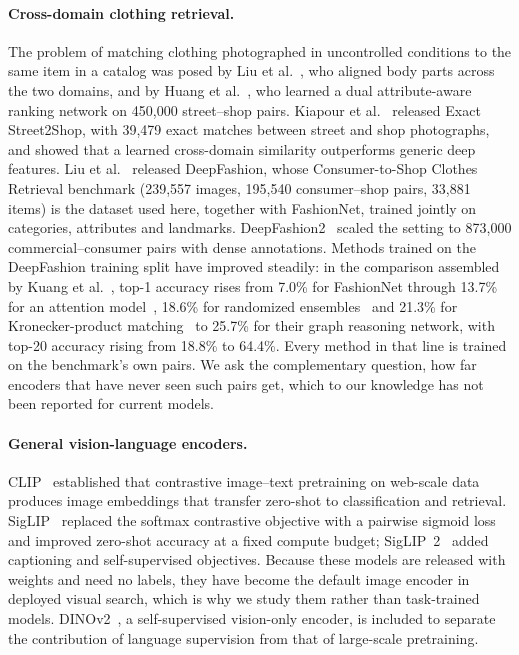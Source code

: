 \documentclass[10pt,twocolumn,letterpaper]{article}
\begin{document}
\paragraph{Cross-domain clothing retrieval.}
The problem of matching clothing photographed in uncontrolled conditions to the same item in a catalog was posed by Liu et al.~\cite{liu2012street}, who aligned body parts across the two domains, and by Huang et al.~\cite{huang2015darn}, who learned a dual attribute-aware ranking network on 450,000 street--shop pairs. Kiapour et al.~\cite{kiapour2015where} released Exact Street2Shop, with 39,479 exact matches between street and shop photographs, and showed that a learned cross-domain similarity outperforms generic deep features. Liu et al.~\cite{liu2016deepfashion} released DeepFashion, whose Consumer-to-Shop Clothes Retrieval benchmark (239,557 images, 195,540 consumer--shop pairs, 33,881 items) is the dataset used here, together with FashionNet, trained jointly on categories, attributes and landmarks. DeepFashion2~\cite{ge2019deepfashion2} scaled the setting to 873,000 commercial--consumer pairs with dense annotations. Methods trained on the DeepFashion training split have improved steadily: in the comparison assembled by Kuang et al.~\cite{kuang2019grnet}, top-1 accuracy rises from 7.0\% for FashionNet through 13.7\% for an attention model~\cite{wang2017vam}, 18.6\% for randomized ensembles~\cite{xuan2018dreml} and 21.3\% for Kronecker-product matching~\cite{shen2018kpm} to 25.7\% for their graph reasoning network, with top-20 accuracy rising from 18.8\% to 64.4\%. Every method in that line is trained on the benchmark's own pairs. We ask the complementary question, how far encoders that have never seen such pairs get, which to our knowledge has not been reported for current models.

\paragraph{General vision-language encoders.}
CLIP~\cite{radford2021clip} established that contrastive image--text pretraining on web-scale data produces image embeddings that transfer zero-shot to classification and retrieval. SigLIP~\cite{zhai2023siglip} replaced the softmax contrastive objective with a pairwise sigmoid loss and improved zero-shot accuracy at a fixed compute budget; SigLIP~2~\cite{tschannen2025siglip2} added captioning and self-supervised objectives. Because these models are released with weights and need no labels, they have become the default image encoder in deployed visual search, which is why we study them rather than task-trained models. DINOv2~\cite{oquab2024dinov2}, a self-supervised vision-only encoder, is included to separate the contribution of language supervision from that of large-scale pretraining.
\end{document}
